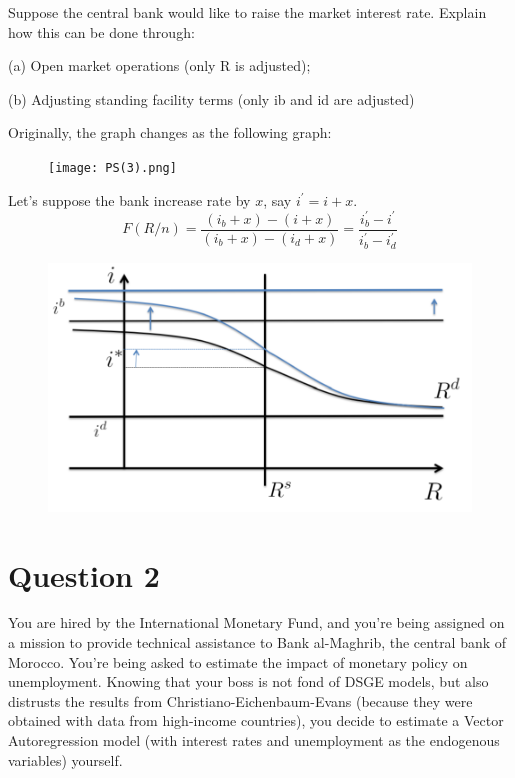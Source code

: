 \begin{problem*}[3]
    Suppose the central bank would like to raise the market interest rate.
    Explain how this can be done through:

        (a) Open market operations (only R is adjusted);

        (b) Adjusting standing facility terms (only ib and id are adjusted)
\end{problem*}

\begin{solution}
    Originally, the graph changes as the following graph:
    
    \begin{figure}[h!]
        \centering
        \texttt{[image: PS(3).png]}
    \end{figure}

    Let's suppose the bank increase rate by $x$, say $i^{\prime} =i+ x$.
    \[ 
    F(R/n) = \frac{(i_{b} +x) - (i+x)}{(i_{b} +x) - (i_d +x)} = \frac{i_{b} ^{\prime} -i^{\prime} }{i_{b} ^{\prime} -i_d^{\prime}}
    \]
    \begin{figure}[h!]
        \centering
        \includegraphics*{figures/PS(3)-2.png}
    \end{figure}
\end{solution}


\section*{Question 2}
You are hired by the International Monetary Fund, and you're being assigned on a mission to provide
technical assistance to Bank al-Maghrib, the central bank of Morocco. You're being asked to estimate
the impact of monetary policy on unemployment. Knowing that your boss is not fond of DSGE models,
but also distrusts the results from Christiano-Eichenbaum-Evans (because they were obtained with data
from high-income countries), you decide to estimate a Vector Autoregression model (with interest rates
and unemployment as the endogenous variables) yourself.

